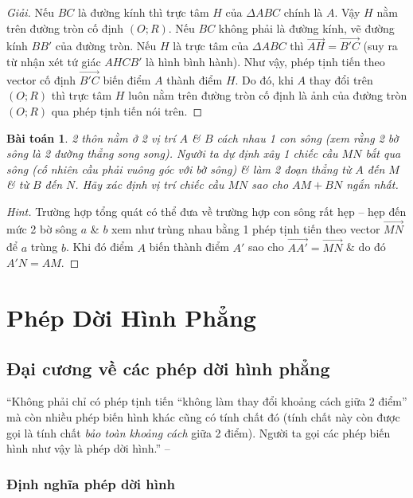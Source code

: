 \documentclass[oneside]{book}
\numberwithin{equation}{section}
\newtheorem{baitoan}{Bài toán}[section]
\begin{document}
\begin{proof}[Giải]
	Nếu $BC$ là đường kính thì trực tâm $H$ của $\Delta ABC$ chính là $A$. Vậy $H$ nằm trên đường tròn cố định $(O;R)$. Nếu $BC$ không phải là đường kính, vẽ đường kính $BB'$ của đường tròn. Nếu $H$ là trực tâm của $\Delta ABC$ thì $\overrightarrow{AH} = \overrightarrow{B'C}$ (suy ra từ nhận xét tứ giác $AHCB'$ là hình bình hành). Như vậy, phép tịnh tiến theo vector cố định $\overrightarrow{B'C}$ biến điểm $A$ thành điểm $H$. Do đó, khi $A$ thay đổi trên $(O;R)$ thì trực tâm $H$ luôn nằm trên đường tròn cố định là ảnh của đường tròn $(O;R)$ qua phép tịnh tiến nói trên.
\end{proof}

\begin{baitoan}
	2 thôn nằm ở 2 vị trí $A$ \& $B$ cách nhau 1 con sông (xem rằng 2 bờ sông là 2 đường thẳng song song). Người ta dự định xây 1 chiếc cầu $MN$ bắt qua sông (cố nhiên cầu phải vuông góc với bờ sông) \& làm 2 đoạn thẳng từ $A$ đến $M$ \& từ $B$ đến $N$. Hãy xác định vị trí chiếc cầu $MN$ sao cho $AM + BN$ ngắn nhất.
\end{baitoan}

\begin{proof}[Hint]
	Trường hợp tổng quát có thể đưa về trường hợp con sông rất hẹp -- hẹp đến mức 2 bờ sông $a$ \& $b$ xem như trùng nhau bằng 1 phép tịnh tiến theo vector $\overrightarrow{MN}$ để $a$ trùng $b$. Khi đó điểm $A$ biến thành điểm $A'$ sao cho $\overrightarrow{AA'} = \overrightarrow{MN}$ \& do đó $A'N = AM$.
\end{proof}

\section{Phép Dời Hình Phẳng}

\subsection{Đại cương về các phép dời hình phẳng}
``Không phải chỉ có phép tịnh tiến ``không làm thay đổi khoảng cách giữa 2 điểm'' mà còn nhiều phép biến hình khác cũng có tính chất đó (tính chất này còn được gọi là tính chất \textit{bảo toàn khoảng cách} giữa 2 điểm). Người ta gọi các phép biến hình như vậy là phép dời hình.'' -- \cite[p. 8]{SGK_Toan_11_hinh_hoc_nang_cao}

\subsubsection{Định nghĩa phép dời hình}
\end{document}
